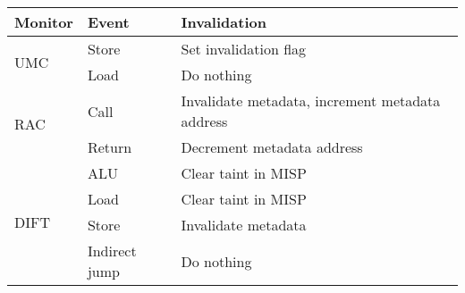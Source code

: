 
\begin{tabular}{|l|l||l|}
\hline

{\bf Monitor} & {\bf Event} & {\bf Invalidation} \\ \hline \hline

\multirow{2}{*}{UMC}  
& Store & Set invalidation flag \\ \cline{2-3}
& Load & Do nothing \\ 
\hline\hline

\multirow{2}{*}{RAC}  
& Call & Invalidate metadata, increment metadata address \\ \cline{2-3}
& Return & Decrement metadata address \\ 
\hline\hline

\multirow{4}{*}{DIFT}  
& ALU & Clear taint in MISP \\ \cline{2-3}
& Load & Clear taint in MISP \\ \cline{2-3}
& Store & Invalidate metadata \\ \cline{2-3}
& Indirect jump & Do nothing \\ \hline

\end{tabular}
